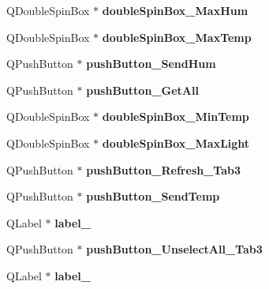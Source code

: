 \begin{DoxyCompactItemize}
Q\+Double\+Spin\+Box $\ast$ {\bfseries double\+Spin\+Box\+\_\+\+Max\+Hum}
\item 
\mbox{\label{classUi__MainWindow_a5bab75d74505fa829093f311bb307508}} 
Q\+Double\+Spin\+Box $\ast$ {\bfseries double\+Spin\+Box\+\_\+\+Max\+Temp}
\item 
\mbox{\label{classUi__MainWindow_a47810629290f2e1ba21977f55e52b129}} 
Q\+Push\+Button $\ast$ {\bfseries push\+Button\+\_\+\+Send\+Hum}
\item 
\mbox{\label{classUi__MainWindow_a8cb72b82508440b5c81cb847300b03e2}} 
Q\+Push\+Button $\ast$ {\bfseries push\+Button\+\_\+\+Get\+All}
\item 
\mbox{\label{classUi__MainWindow_a3f028e9597f57e3bd5f7c8fa88f3193f}} 
Q\+Double\+Spin\+Box $\ast$ {\bfseries double\+Spin\+Box\+\_\+\+Min\+Temp}
\item 
\mbox{\label{classUi__MainWindow_a363164fcb735cb39dfd553be02f1bbe8}} 
Q\+Double\+Spin\+Box $\ast$ {\bfseries double\+Spin\+Box\+\_\+\+Max\+Light}
\item 
\mbox{\label{classUi__MainWindow_adfb1b0c2aa8707cc0b91acefed71a4ba}} 
Q\+Push\+Button $\ast$ {\bfseries push\+Button\+\_\+\+Refresh\+\_\+\+Tab3}
\item 
\mbox{\label{classUi__MainWindow_a3c00b7221017c7fcf302a452db43cece}} 
Q\+Push\+Button $\ast$ {\bfseries push\+Button\+\_\+\+Send\+Temp}
\item 
\mbox{\label{classUi__MainWindow_af183bfbfb9f38bbdd60caf92b15e23dc}} 
Q\+Label $\ast$ {\bfseries label\+\_}
\item 
\mbox{\label{classUi__MainWindow_a0bf05805e34e0041ea44f5e6681f6a0b}} 
Q\+Push\+Button $\ast$ {\bfseries push\+Button\+\_\+\+Unselect\+All\+\_\+\+Tab3}
\item 
\mbox{\label{classUi__MainWindow_a78c7e10730b43c6700cd7216911ed76a}} 
Q\+Label $\ast$ {\bfseries label\+\_}
\item 

\end{DoxyCompactItemize}
